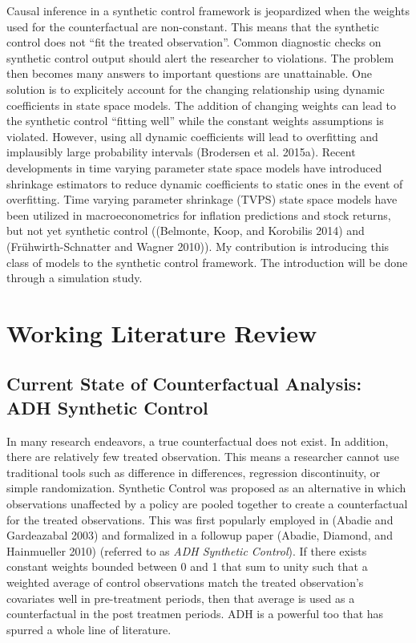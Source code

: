 \documentclass[
]{article}
\begin{document}
Causal inference in a synthetic control framework is jeopardized when
the weights used for the counterfactual are non-constant. This means
that the synthetic control does not ``fit the treated observation''.
Common diagnostic checks on synthetic control output should alert the
researcher to violations. The problem then becomes many answers to
important questions are unattainable. One solution is to explicitely
account for the changing relationship using dynamic coefficients in
state space models. The addition of changing weights can lead to the
synthetic control ``fitting well'' while the constant weights
assumptions is violated. However, using all dynamic coefficients will
lead to overfitting and implausibly large probability intervals
(Brodersen et al. 2015a). Recent developments in time varying parameter
state space models have introduced shrinkage estimators to reduce
dynamic coefficients to static ones in the event of overfitting. Time
varying parameter shrinkage (TVPS) state space models have been utilized
in macroeconometrics for inflation predictions and stock returns, but
not yet synthetic control ((Belmonte, Koop, and Korobilis 2014) and
(Frühwirth-Schnatter and Wagner 2010)). My contribution is introducing
this class of models to the synthetic control framework. The
introduction will be done through a simulation study.

\hypertarget{working-literature-review}{%
\section{Working Literature Review}\label{working-literature-review}}

\hypertarget{current-state-of-counterfactual-analysis-adh-synthetic-control}{%
\subsection{Current State of Counterfactual Analysis: ADH Synthetic
Control}\label{current-state-of-counterfactual-analysis-adh-synthetic-control}}

In many research endeavors, a true counterfactual does not exist. In
addition, there are relatively few treated observation. This means a
researcher cannot use traditional tools such as difference in
differences, regression discontinuity, or simple randomization.
Synthetic Control was proposed as an alternative in which observations
unaffected by a policy are pooled together to create a counterfactual
for the treated observations. This was first popularly employed in
(Abadie and Gardeazabal 2003) and formalized in a followup paper
(Abadie, Diamond, and Hainmueller 2010) (referred to as \emph{ADH
Synthetic Control}). If there exists constant weights bounded between 0
and 1 that sum to unity such that a weighted average of control
observations match the treated observation's covariates well in
pre-treatment periods, then that average is used as a counterfactual in
the post treatmen periods. ADH is a powerful too that has spurred a
whole line of literature.
\end{document}
